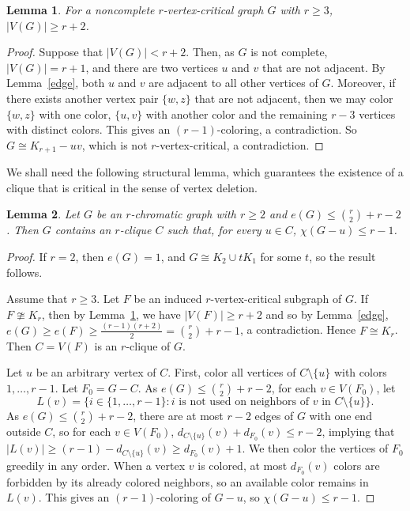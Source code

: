 \documentclass[12pt]{article}
\newtheorem{lemma}{Lemma}[section]
\begin{document}
\begin{lemma}\label{order}
For a noncomplete  $r$-vertex-critical graph $G$ with  $r\ge 3$, $|V(G)|\ge r+2$. 
\end{lemma}
\begin{proof}  Suppose that  $|V(G)|< r+2$. Then, as $G$ is not complete, $|V(G)|=r+1$, and there are two vertices $u$ and $v$ that  are not adjacent. By Lemma~\ref{edge}, both $u$ and $v$ are adjacent to all other vertices of $G$. Moreover, if there exists another vertex pair $\{w,z\}$ that are not adjacent, then we may color $\{w,z\}$ with one color, $\{u,v\}$ with another color and the remaining $r-3$ vertices with distinct colors. This gives an $(r-1)$-coloring, a contradiction. So $G\cong K_{r+1}-uv$, which is not $r$-vertex-critical, a contradiction. 
\end{proof}



We shall need the following structural lemma, which guarantees the existence of a clique that is critical in the sense of vertex deletion. 

\begin{lemma}\label{lem:small-extremal-coloring}
Let $G$ be an $r$-chromatic graph with $r\ge 2$ and $e(G) \le \binom{r}{2}+r-2$.
Then $G$ contains an $r$-clique $C$ such that, for every $u\in C$,
$\chi(G-u)\le r-1$.
\end{lemma}

\begin{proof}
If $r=2$, then $e(G)=1$, and $G\cong K_2\cup tK_1$ for some $t$, so the result follows. 

Assume that $r\ge 3$. 
Let $F$ be an induced $r$-vertex-critical subgraph of $G$. 
If $F\ncong K_r$, then by Lemma~\ref{order}, we have $|V(F)|\ge r+2$ and so by Lemma~\ref{edge}, $e(G)\ge e(F)\ge \frac{(r-1)(r+2)}{2}=\binom{r}{2}+r-1$, a contradiction. Hence $F\cong K_r$. Then $C=V(F)$ is an $r$-clique of $G$.

Let $u$ be an arbitrary vertex of $C$.
First, color all vertices of $C\setminus\{u\}$ with  colors $1,\dots, r-1$. Let $F_0=G-C$. As $e(G) \le \binom{r}{2}+r-2$, for each $v\in V(F_0)$, let 
\[
L(v)=\{i\in \{1,\dots, r-1\}: \text{$i$ is not used on neighbors of $v$ in $C\setminus\{u\}$}\}. 
\]
As $e(G)\le \binom{r}{2}+r-2$, there are at most $r-2$ edges of $G$ with one end outside $C$, so for each $v\in V(F_0)$,
$d_{C\setminus\{u\}}(v)+d_{F_0}(v)\le r-2$, implying that 
$|L(v)|\ge (r-1)-d_{C\setminus\{u\}}(v)\ge d_{F_0}(v)+1$.
We then color the vertices of $F_0$ greedily in any order. When a vertex $v$ is colored, at most $d_{F_0}(v)$ colors are forbidden by its already colored neighbors, so an available color remains
in $L(v)$. This gives an $(r-1)$-coloring of $G-u$, so $\chi(G-u)\le r-1$.
\end{proof}
\end{document}
